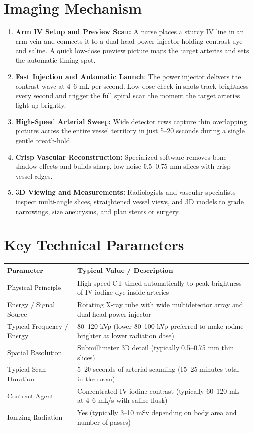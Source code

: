 \section{Imaging Mechanism}
\begin{enumerate}
    \item \textbf{Arm IV Setup and Preview Scan:} A nurse places a sturdy IV line in an arm vein and connects it to a dual-head power injector holding contrast dye and saline. A quick low-dose preview picture maps the target arteries and sets the automatic timing spot.
    \item \textbf{Fast Injection and Automatic Launch:} The power injector delivers the contrast wave at 4--6 mL per second. Low-dose check-in shots track brightness every second and trigger the full spiral scan the moment the target arteries light up brightly.
    \item \textbf{High-Speed Arterial Sweep:} Wide detector rows capture thin overlapping pictures across the entire vessel territory in just 5--20 seconds during a single gentle breath-hold.
    \item \textbf{Crisp Vascular Reconstruction:} Specialized software removes bone-shadow effects and builds sharp, low-noise 0.5--0.75 mm slices with crisp vessel edges.
    \item \textbf{3D Viewing and Measurements:} Radiologists and vascular specialists inspect multi-angle slices, straightened vessel views, and 3D models to grade narrowings, size aneurysms, and plan stents or surgery.
\end{enumerate}

\section{Key Technical Parameters}
\noindent
\begin{tabularx}{\textwidth}{@{}l X@{}}
\toprule
\textbf{Parameter} & \textbf{Typical Value / Description} \\
\midrule
Physical Principle & High-speed CT timed automatically to peak brightness of IV iodine dye inside arteries \\
Energy / Signal Source & Rotating X-ray tube with wide multidetector array and dual-head power injector \\
Typical Frequency / Energy & 80--120 kVp (lower 80--100 kVp preferred to make iodine brighter at lower radiation dose) \\
Spatial Resolution & Submillimeter 3D detail (typically 0.5--0.75 mm thin slices) \\
Typical Scan Duration & 5--20 seconds of arterial scanning (15--25 minutes total in the room) \\
Contrast Agent & Concentrated IV iodine contrast (typically 60--120 mL at 4--6 mL/s with saline flush) \\
Ionizing Radiation & Yes (typically 3--10 mSv depending on body area and number of passes) \\
\bottomrule
\end{tabularx}

